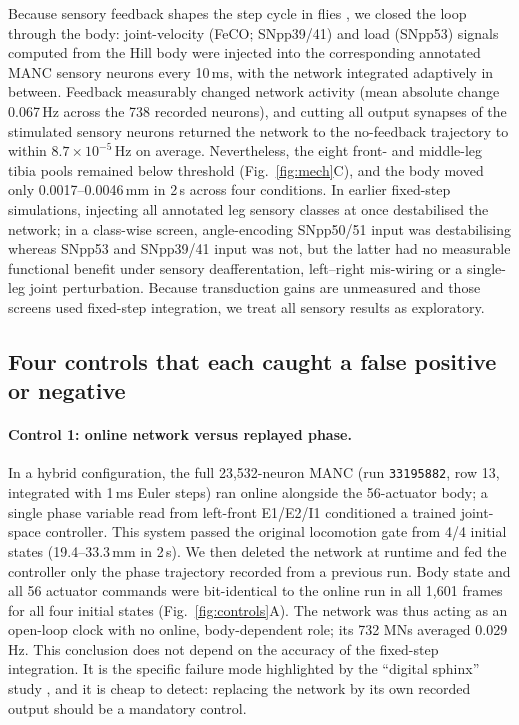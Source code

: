 \documentclass[11pt]{article}
\begin{document}
Because sensory feedback shapes the step cycle in flies \citep{sapkal2026,dallmann2025presynaptic}, we closed the loop through the body: joint-velocity (FeCO; SNpp39/41) and load (SNpp53) signals computed from the Hill body were injected into the corresponding annotated MANC sensory neurons every 10\,ms, with the network integrated adaptively in between. Feedback measurably changed network activity (mean absolute change 0.067\,Hz across the 738 recorded neurons), and cutting all output synapses of the stimulated sensory neurons returned the network to the no-feedback trajectory to within $8.7\times10^{-5}$\,Hz on average. Nevertheless, the eight front- and middle-leg tibia pools remained below threshold (Fig.~\ref{fig:mech}C), and the body moved only 0.0017--0.0046\,mm in 2\,s across four conditions. In earlier fixed-step simulations, injecting all annotated leg sensory classes at once destabilised the network; in a class-wise screen, angle-encoding SNpp50/51 input was destabilising whereas SNpp53 and SNpp39/41 input was not, but the latter had no measurable functional benefit under sensory deafferentation, left--right mis-wiring or a single-leg joint perturbation. Because transduction gains are unmeasured and those screens used fixed-step integration, we treat all sensory results as exploratory.

\subsection{Four controls that each caught a false positive or negative}
\label{sec:controls}

\paragraph{Control 1: online network versus replayed phase.}
In a hybrid configuration, the full 23,532-neuron MANC (run \texttt{33195882}, row 13, integrated with 1\,ms Euler steps) ran online alongside the 56-actuator body; a single phase variable read from left-front E1/E2/I1 conditioned a trained joint-space controller. This system passed the original locomotion gate from 4/4 initial states (19.4--33.3\,mm in 2\,s). We then deleted the network at runtime and fed the controller only the phase trajectory recorded from a previous run. Body state and all 56 actuator commands were bit-identical to the online run in all 1,601 frames for all four initial states (Fig.~\ref{fig:controls}A). The network was thus acting as an open-loop clock with no online, body-dependent role; its 732 MNs averaged 0.029\,Hz. This conclusion does not depend on the accuracy of the fixed-step integration. It is the specific failure mode highlighted by the ``digital sphinx'' study \citep{brunton2026sphinx}, and it is cheap to detect: replacing the network by its own recorded output should be a mandatory control.
\end{document}
